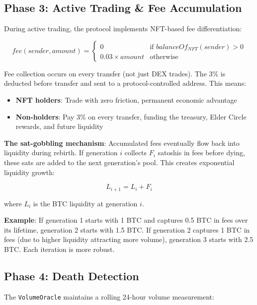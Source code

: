 \documentclass[11pt,a4paper]{article}
\begin{document}
\subsection{Phase 3: Active Trading \& Fee Accumulation}

During active trading, the protocol implements NFT-based fee differentiation:

\begin{equation}
fee(sender, amount) = \begin{cases}
    0 & \text{if } balanceOf_{NFT}(sender) > 0 \\
    0.03 \times amount & \text{otherwise}
\end{cases}
\end{equation}

Fee collection occurs on every transfer (not just DEX trades). The 3\% is deducted before transfer and sent to a protocol-controlled address. This means:

\begin{itemize}
    \item \textbf{NFT holders}: Trade with zero friction, permanent economic advantage
    \item \textbf{Non-holders}: Pay 3\% on every transfer, funding the treasury, Elder Circle rewards, and future liquidity
\end{itemize}

\textbf{The sat-gobbling mechanism}: Accumulated fees eventually flow back into liquidity during rebirth. If generation $i$ collects $F_i$ satoshis in fees before dying, these sats are added to the next generation's pool. This creates exponential liquidity growth:

\begin{equation}
L_{i+1} = L_i + F_i
\end{equation}

where $L_i$ is the BTC liquidity at generation $i$.

\textbf{Example}: If generation 1 starts with 1 BTC and captures 0.5 BTC in fees over its lifetime, generation 2 starts with 1.5 BTC. If generation 2 captures 1 BTC in fees (due to higher liquidity attracting more volume), generation 3 starts with 2.5 BTC. Each iteration is more robust.

\subsection{Phase 4: Death Detection}

The \texttt{VolumeOracle} maintains a rolling 24-hour volume measurement:
\end{document}
